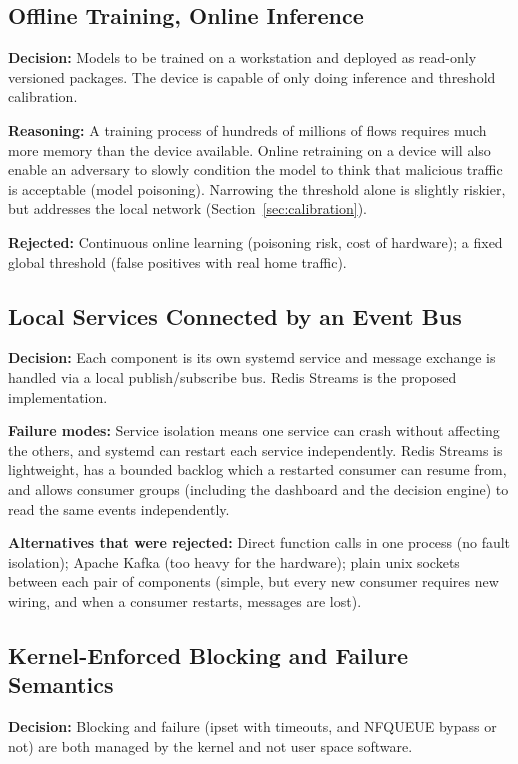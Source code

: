 \subsection{Offline Training, Online Inference}\label{sec:6.4.3}
\noindent \textbf{Decision:} Models to be trained on a workstation and deployed as read-only versioned packages. The device is capable of only doing inference and threshold calibration.

\noindent \textbf{Reasoning:} A training process of hundreds of millions of flows requires much more memory than the device available. Online retraining on a device will also enable an adversary to slowly condition the model to think that malicious traffic is acceptable (model poisoning). Narrowing the threshold alone is slightly riskier, but addresses the local network (Section~\ref{sec:calibration}).

\noindent \textbf{Rejected:} Continuous online learning (poisoning risk, cost of hardware); a fixed global threshold (false positives with real home traffic).

\subsection{Local Services Connected by an Event Bus}\label{sec:6.4.4}
\noindent \textbf{Decision:} Each component is its own systemd service and message exchange is handled via a local publish/subscribe bus. Redis Streams is the proposed implementation.

\noindent \textbf{Failure modes:} Service isolation means one service can crash without affecting the others, and systemd can restart each service independently. Redis Streams is lightweight, has a bounded backlog which a restarted consumer can resume from, and allows consumer groups (including the dashboard and the decision engine) to read the same events independently.

\noindent \textbf{Alternatives that were rejected:} Direct function calls in one process (no fault isolation); Apache Kafka (too heavy for the hardware); plain unix sockets between each pair of components (simple, but every new consumer requires new wiring, and when a consumer restarts, messages are lost).

\subsection{Kernel-Enforced Blocking and Failure Semantics}\label{sec:6.4.5}
\noindent \textbf{Decision:} Blocking and failure (ipset with timeouts, and NFQUEUE bypass or not) are both managed by the kernel and not user space software.

